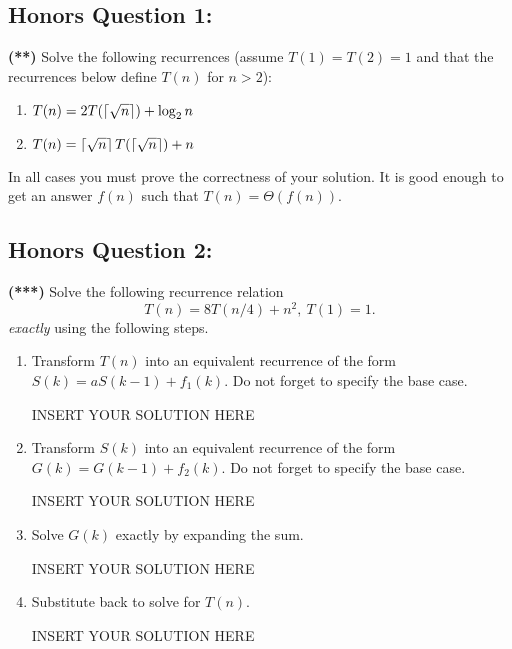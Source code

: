 \subsection*{Honors Question 1:}
{\bf (**)}
Solve the following recurrences (assume $T(1)=T(2)=1$ and that the recurrences below define $T(n)$ for $n>2$):
\begin{enumerate}
    \item $T(n)=2T(\left\lceil \sqrt{n} \right\rceil)+\log_2 n$
    \item $T(n)=\left\lceil \sqrt{n} \right\rceil T(\left\lceil \sqrt{n} \right\rceil)+n$
\end{enumerate}
In all cases you must prove the correctness of your solution. It is good enough to get an answer $f(n)$ such that $T(n)=\Theta(f(n))$.

\subsection*{Honors Question 2:}
{\bf (***)} Solve the following recurrence relation
\begin{equation*}
	T(n)=8T\left(n/4\right)+n^2,~T(1)=1.
\end{equation*}
\emph{exactly} using the following steps.

\begin{enumerate}
	\item %
	Transform $T(n)$ into an equivalent	recurrence of the form $S(k) = a S(k-1) + f_1(k)$. Do not forget to specify the base case. 
	
\begin{solution}   INSERT YOUR SOLUTION HERE   \end{solution}
	
	\item %
	Transform $S(k)$ into an equivalent	recurrence of the form $G(k) = G(k-1) + f_2(k)$. Do not forget to specify the base case.
	
\begin{solution}   INSERT YOUR SOLUTION HERE   \end{solution}
	
	\item %
	Solve $G(k)$ exactly by expanding the sum.
	
\begin{solution}   INSERT YOUR SOLUTION HERE   \end{solution}

	\item %
	Substitute back to solve for $T(n)$.
	
\begin{solution}   INSERT YOUR SOLUTION HERE   \end{solution}
\end{enumerate}

